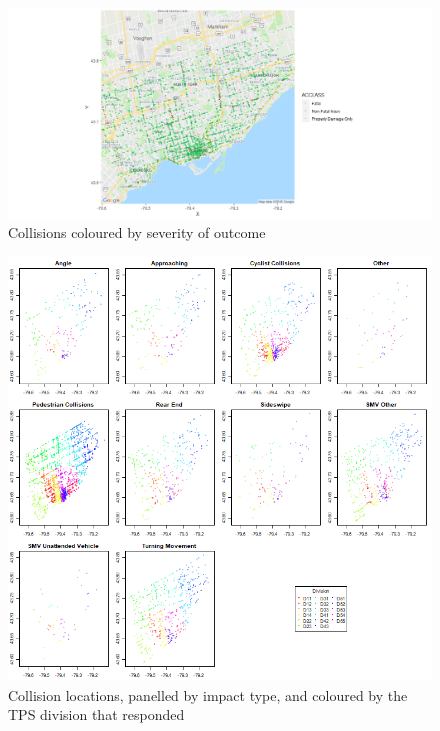 \documentclass{article}
\begin{document}
\begin{figure}[!h]
	\begin{center}
		\includegraphics[scale = 0.5]{FatalityMap}
		\caption{Collisions coloured by severity of outcome}
		\label{fig:fatalitymap}
	\end{center}
\end{figure}

\begin{figure}[!h]
	\begin{center}
		\includegraphics[scale = 0.75]{impactPanel}
		\caption{Collision locations, panelled by impact type, and coloured by the TPS division that responded}
		\label{fig:impactpanel}
	\end{center}
\end{figure}
\end{document}
